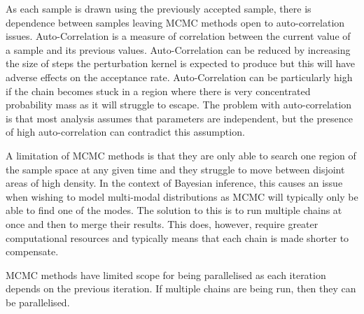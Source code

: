 \documentclass[11pt,a4paper]{article}
\theoremstyle{break}
\begin{document}
  \par As each sample is drawn using the previously accepted sample, there is dependence between samples leaving MCMC methods open to auto-correlation issues. Auto-Correlation is a measure of correlation between the current value of a sample and its previous values. Auto-Correlation can be reduced by increasing the size of steps the perturbation kernel is expected to produce but this will have adverse effects on the acceptance rate. Auto-Correlation can be particularly high if the chain becomes stuck in a region where there is very concentrated probability mass as it will struggle to escape. The problem with auto-correlation is that most analysis assumes that parameters are independent, but the presence of high auto-correlation can contradict this assumption.

  \par A limitation of MCMC methods is that they are only able to search one region of the sample space at any given time and they struggle to move between disjoint areas of high density. In the context of Bayesian inference, this causes an issue when wishing to model multi-modal distributions as MCMC will typically only be able to find one of the modes. The solution to this is to run multiple chains at once and then to merge their results. This does, however, require greater computational resources and typically means that each chain is made shorter to compensate.

  \par MCMC methods have limited scope for being parallelised as each iteration depends on the previous iteration. If multiple chains are being run, then they can be parallelised.
\end{document}
